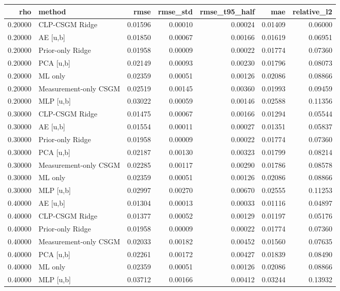 \begin{tabular}{rlrrrrr}
\toprule
rho & method & rmse & rmse\_std & rmse\_t95\_half & mae & relative\_l2 \\
\midrule
0.20000 & CLP-CSGM Ridge & 0.01596 & 0.00010 & 0.00024 & 0.01409 & 0.06000 \\
0.20000 & AE [u,b] & 0.01850 & 0.00067 & 0.00166 & 0.01619 & 0.06951 \\
0.20000 & Prior-only Ridge & 0.01958 & 0.00009 & 0.00022 & 0.01774 & 0.07360 \\
0.20000 & PCA [u,b] & 0.02149 & 0.00093 & 0.00230 & 0.01796 & 0.08073 \\
0.20000 & ML only & 0.02359 & 0.00051 & 0.00126 & 0.02086 & 0.08866 \\
0.20000 & Measurement-only CSGM & 0.02519 & 0.00145 & 0.00360 & 0.01993 & 0.09459 \\
0.20000 & MLP [u,b] & 0.03022 & 0.00059 & 0.00146 & 0.02588 & 0.11356 \\
0.30000 & CLP-CSGM Ridge & 0.01475 & 0.00067 & 0.00166 & 0.01294 & 0.05544 \\
0.30000 & AE [u,b] & 0.01554 & 0.00011 & 0.00027 & 0.01351 & 0.05837 \\
0.30000 & Prior-only Ridge & 0.01958 & 0.00009 & 0.00022 & 0.01774 & 0.07360 \\
0.30000 & PCA [u,b] & 0.02187 & 0.00130 & 0.00323 & 0.01799 & 0.08214 \\
0.30000 & Measurement-only CSGM & 0.02285 & 0.00117 & 0.00290 & 0.01786 & 0.08578 \\
0.30000 & ML only & 0.02359 & 0.00051 & 0.00126 & 0.02086 & 0.08866 \\
0.30000 & MLP [u,b] & 0.02997 & 0.00270 & 0.00670 & 0.02555 & 0.11253 \\
0.40000 & AE [u,b] & 0.01304 & 0.00013 & 0.00033 & 0.01116 & 0.04897 \\
0.40000 & CLP-CSGM Ridge & 0.01377 & 0.00052 & 0.00129 & 0.01197 & 0.05176 \\
0.40000 & Prior-only Ridge & 0.01958 & 0.00009 & 0.00022 & 0.01774 & 0.07360 \\
0.40000 & Measurement-only CSGM & 0.02033 & 0.00182 & 0.00452 & 0.01560 & 0.07635 \\
0.40000 & PCA [u,b] & 0.02261 & 0.00172 & 0.00427 & 0.01839 & 0.08490 \\
0.40000 & ML only & 0.02359 & 0.00051 & 0.00126 & 0.02086 & 0.08866 \\
0.40000 & MLP [u,b] & 0.03712 & 0.00166 & 0.00412 & 0.03244 & 0.13932 \\

\end{tabular}
